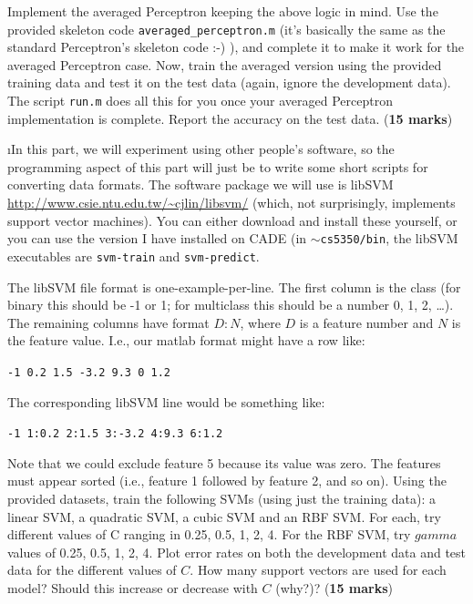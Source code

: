 \documentclass[fleqn]{article}
\begin{document}
Implement the averaged Perceptron keeping the above logic in mind. Use the
provided skeleton code \texttt{averaged\_perceptron.m} (it's basically 
the same as the standard Perceptron's skeleton
code :-) ), and complete it to make it work for the averaged 
Perceptron case. Now, train the averaged version using the provided training 
data and test it on the test data (again, ignore the development data). 
The script \texttt{run.m} does all this for you once your averaged Perceptron 
implementation is complete. Report the accuracy on the test data. (\textbf{15 marks})

\i In this part, we will experiment using other people's software, 
so the programming aspect of this part will just be to write some 
short scripts for converting data formats. The software package we 
will use is libSVM \url{http://www.csie.ntu.edu.tw/~cjlin/libsvm/} 
(which, not surprisingly, implements support vector machines). You 
can either download and install these yourself, or you can use the 
version I have installed on CADE (in \texttt{$\sim$cs5350/bin}, the 
libSVM executables are \texttt{svm-train} and \texttt{svm-predict}.

The libSVM file format is one-example-per-line. The first column is 
the class (for binary this should be -1 or 1; for multiclass this should 
be a number 0, 1, 2, \ldots). The remaining columns have format $D:N$, where
$D$ is a feature number and $N$ is the feature value. I.e., our matlab format 
might have a row like:

\begin{center}
 \texttt{-1 0.2 1.5 -3.2 9.3 0 1.2}
\end{center}

The corresponding libSVM line would be something like:

\begin{center}
 \texttt{-1 1:0.2 2:1.5 3:-3.2 4:9.3 6:1.2}
\end{center}

Note that we could exclude feature 5 because its value was zero. The features 
must appear sorted (i.e., feature 1 followed by feature 2, and so on). Using 
the provided datasets, train the following SVMs (using just the training data): 
a linear SVM, a quadratic SVM, a cubic SVM and an RBF SVM. For each, try different 
values of C ranging in 0.25, 0.5, 1, 2, 4. For the RBF SVM, try $gamma$ values 
of 0.25, 0.5, 1, 2, 4. Plot error rates on both the development data and test 
data for the different values of $C$. How many support vectors are used for each 
model? Should this increase or decrease with $C$ (why?)? (\textbf{15 marks})
\ene
\end{document}
